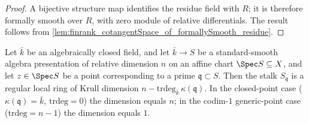 \begin{proof}
  A bijective structure map identifies the residue field with \(R\); it is
  therefore formally smooth over \(R\), with zero module of relative
  differentials.  The result follows from
  \cref{lem:finrank_cotangentSpace_of_formallySmooth_residue}.
\end{proof}

\begin{lemma}
  \label{lem:stage6_regular_stalk_assembly}
  Let \(\bar k\) be an algebraically closed field, and let
  \(\bar k \to S\) be a standard-smooth algebra presentation of
  relative dimension \(n\) on an affine chart \(\Spec S \subseteq X\),
  and let \(z \in \Spec S\) be a point corresponding to a prime
  \(\mathfrak q \subset S\). Then the stalk \(S_{\mathfrak q}\) is a
  regular local ring of Krull dimension
  \(n - \mathrm{trdeg}_{\bar k}\,\kappa(\mathfrak q)\). In the
  closed-point case (\(\kappa(\mathfrak q) = \bar k\),
  \(\mathrm{trdeg} = 0\)) the dimension equals \(n\); in the
  codim-\(1\) generic-point case (\(\mathrm{trdeg} = n - 1\)) the
  dimension equals \(1\).
\end{lemma}

